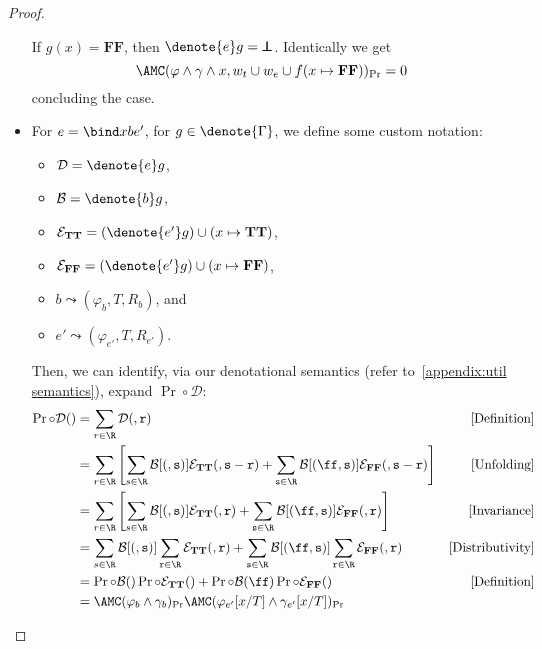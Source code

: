 \begin{proof}
\begin{itemize}[leftmargin=*]
  If $g(x) = \mathbf{FF}$, then $\denote{e} g = \pmb{\bot}$. Identically we get
    $$\AMC(\varphi \land \gamma \land x, w_t \cup w_e \cup f(x \mapsto \mathbf{FF}))_{\Pr}
      =0$$
  concluding the case.
  \item For $e = \bind x {b} {e'}$, for $g \in \denote{\Gamma}$, we define some custom notation:
  \begin{itemize}
    \item $\mathcal D = \denote{e} g$,
    \item $\mathcal B = \denote{b} g$,
    \item $\mathcal{E}_{\mathbf{TT}} = (\denote{e'} g) \cup (x \mapsto \mathbf{TT})$,
    \item $\mathcal{E}_{\mathbf{FF}} =( \denote{e'} g )\cup (x \mapsto \mathbf{FF})$,
    \item $b \leadsto (\varphi_b, T, R_b)$, and
    \item $e' \leadsto (\varphi_{e'}, T, R_{e'})$.
  \end{itemize}
  Then, we can identify, via our denotational semantics (refer to~\cref{appendix:util semantics}), 
  expand 
  $\Pr \circ \mathcal D$:
  \begin{align*}
    \Pr \circ \mathcal D (\tt)
      &= \sum_{r \in \R} \mathcal D (\tt,r) 
      &\text{[Definition]}\\
      &=\sum_{r \in \R} 
        \left[
          \sum_{s \in \R} \mathcal B [(\tt,s)] \mathcal{E}_{\mathbf{TT}} (\tt, s-r)
          + \sum_{s \in \R} \mathcal B [(\ff,s)] \mathcal{E}_{\mathbf{FF}} (\tt, s-r)
        \right]
      &\text{[Unfolding]}\\
      &=\sum_{r \in \R} 
        \left[
          \sum_{s \in \R} \mathcal B [(\tt,s)] \mathcal{E}_{\mathbf{TT}} (\tt, r)
          + \sum_{s \in \R} \mathcal B [(\ff,s)] \mathcal{E}_{\mathbf{FF}} (\tt, r)
        \right]
      &\text{[Invariance]}\\
      &= 
          \sum_{s \in \R} \mathcal B [(\tt,s)] \sum_{r \in \R}\mathcal{E}_ {\mathbf{TT}} (\tt, r)
          + \sum_{s \in \R} \mathcal B [(\ff,s)] \sum_{r \in \R}\mathcal{E}_{\mathbf{FF}} (\tt, r)
      &\text{[Distributivity]} \\
      &= 
        \Pr \circ \mathcal B (\tt)
        \Pr \circ \mathcal{E}_ {\mathbf{TT}} (\tt)
        + \Pr \circ \mathcal B (\ff)
        \Pr \circ \mathcal{E}_ {\mathbf{FF}} (\tt)
      &\text{[Definition]}\\
      &= 
        \AMC(\varphi_b \land \gamma_b)_{\Pr}
        \AMC(\varphi_{e'}[x / T] \land \gamma_{e'}[x/T])_{\Pr}

\end{align*}
\end{itemize}
\end{proof}
